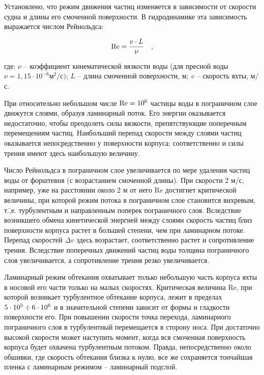 Установлено, что режим движения частиц изменяется в зависимости от скорости судна и длины его смоченной поверхности. В гидродинамике эта зависимость выражается числом Рейнольдса:

\begin{equation}
  \mathrm {Re} = \frac{v \cdot L}{\nu} \quad , 
\end{equation}

где: $\nu$ \--- коэффициент кинематической вязкости воды (для пресной воды $\nu = 1,15 \cdot 10^{-6} \text{м}^2/\text{с})$; $L$ \--- длина смоченной поверхности, м; $v$ \--- скорость яхты, м/с. 

При относительно небольшом числе $\mathrm {Re} = 10^6$ частицы воды в пограничном слое движутся слоями, образуя ламинарный поток. Его энергии оказывается недостаточно, чтобы преодолеть силы вязкости, препятствующие поперечным перемещениям частиц. Наибольший перепад скорости между слоями частиц оказывается непосредственно у поверхности корпуса; соответственно и силы трения имеют здесь наибольшую величину. 

Число Рейнольдса в пограничном слое увеличивается по мере удаления частиц воды от форштевня (с возрастанием смоченной длины). При скорости 2 м/с, например, уже на расстоянии около 2 м от него Re достигнет критической величины, при которой режим потока в пограничном слое становится вихревым, т.\=,е. турбулентным и направленным поперек пограничного слоя. Вследствие возникшего обмена кинетической энергией между слоями скорость частиц близ поверхности корпуса растет в большей степени, чем при ламинарном потоке. Перепад скоростей $\Delta v$ здесь возрастает, соответственно растет и сопротивление трения. Вследствие поперечных движений частиц воды толщина пограничного слоя увеличивается, а сопротивление трения резко увеличивается. 

Ламинарный режим обтекания охватывает только небольшую часть корпуса яхты в носовой его части только на малых скоростях. Критическая величина Re, при которой возникает турбулентное обтекание корпуса, лежит в пределах $5 \cdot 10^5\div 6 \cdot 10^6$ и в значительной степени зависит от формы и гладкости поверхности его. При повышении скорости точка перехода, ламинарного пограничного слоя в турбулентный перемещается в сторону носа. При достаточно высокой скорости может наступить момент, когда вся смоченная поверхность корпуса будет охвачена турбулентным потоком. Правда, непосредственно около обшивки, где скорость обтекания близка к нулю, все же сохраняется тончайшая пленка с ламинарным режимом \--- ламинарный подслой. 

